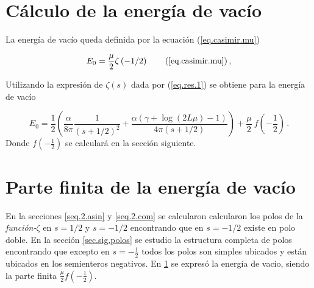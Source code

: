 \begin{comment}
\begin{equation}
\frac{1 }{2 \pi i}
\int _{circulo} \lambda ^{-2s } \partial \lambda \ Ln \left[
					\frac{e ^{\frac{i \alpha  \log ( 2 \lambda L )}{2 \lambda}} e ^{2 i \lambda L} S1}
					{\Gamma \left( 1 - \frac{i \alpha}{2 \lambda} \right)} - 
					\frac{e ^{\frac{-i \alpha  \log (2 \lambda L )}{2 \lambda}} S2}
					{\Gamma \left( 1 + \frac{i \alpha}{2 \lambda} \right)}					
					\right] d \lambda
\end{equation}
\end{comment}


\section{Cálculo de la energía de vacío}
\label{sec.regular}

La energía de vacío queda definida por la ecuación (\ref{eq.casimir.mu})

\begin{equation}
    E _0 = \frac{\mu }{2}  
    \zeta  \left( - 1/2 \right) 
    \tag{\ref{eq.casimir.mu}} \, ,
\end{equation}

Utilizando la expresión de $\zeta  (s )$ dada por (\ref{eq.res.1}) se obtiene para la energía de vacío

\begin{equation}\label{eq.casimir.resultado}
E _0 = \frac{1}{2} \left(
				\frac{\alpha}{8 \pi  } \frac{1}{(s+1/2)^2} + 
				\frac{\alpha ( \gamma  +  \log (2L \mu ) -1 )}{4 \pi  (s+1/2)}
				\right) + 
				\frac{\mu}{2} \ f \left( - \frac{1}{2} \right)
\, .
\end{equation}
Donde $f \left( - \frac{1}{2}\right)$ se calculará en la sección siguiente.


\section{Parte finita de la energía de vacío}

En la secciones \ref{seq.2.asin} y \ref{seq.2.com} se calcularon calcularon los polos de la \mbox{{\it función-$\zeta$}} en $s=1/2$ y $s=-1/2$ encontrando que en $s=-1/2$ existe en polo doble. En la sección \ref{sec.sig.polos} se estudio la estructura completa de polos encontrando que excepto en $s= - \frac{1}{2}$ todos los polos son simples ubicados y están ubicados en los semienteros negativos. En \ref{sec.regular} se expresó la energía de vacío, siendo la parte finita $\frac{\mu}{2} f \left( - \frac{1}{2} \right)$. 

